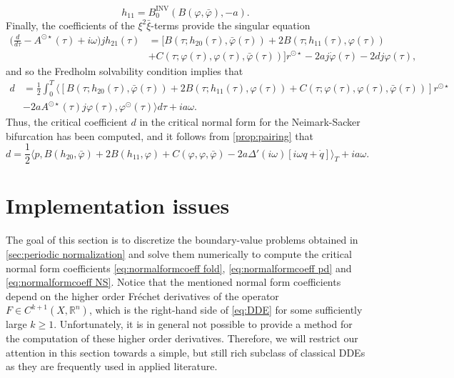 \documentclass[english]{myarticle}
\DeclareMathOperator{\inv}{INV}
\begin{document}
\begin{sloppypar}
\begin{equation*}
    h_{11} = B_{0}^{\inv}(B(\varphi,\bar{\varphi}), -a).
\end{equation*}
Finally, the coefficients of the $\xi^2 \bar{\xi}$-terms provide the singular equation
\begin{align*}
    \bigg(\frac{d}{d \tau} - A^{\odot \star}(\tau) + {i \omega} \bigg)j h_{21}(\tau)  &= [B(\tau;h_{20}(\tau),\bar{\varphi}(\tau)) + 2B(\tau;h_{11}(\tau),\varphi(\tau)) \\
    & + C(\tau;\varphi(\tau),\varphi(\tau),\bar{\varphi}(\tau))]r^{\odot \star} - 2 a j\dot{\varphi}(\tau) -2d j\varphi(\tau),
\end{align*}
and so the Fredholm solvability condition implies that
\begin{align*} 
    d &= \frac{1}{2}\int_0^T \langle [B(\tau;h_{20}(\tau),\bar{\varphi}(\tau)) + 2B(\tau;h_{11}(\tau),\varphi(\tau))  + C(\tau;\varphi(\tau),\varphi(\tau),\bar{\varphi}(\tau))]r^{\odot \star} \nonumber\\ 
    & - 2aA^{\odot \star}(\tau)j\varphi(\tau),  \varphi^\odot(\tau) \rangle  d\tau + i a \omega.
\end{align*}
Thus, the critical coefficient $d$ in the critical normal form for the Neimark-Sacker bifurcation has been computed, and it follows from \cref{prop:pairing} that
\begin{equation} \label{eq:normalformcoeff NS}
    d = \frac{1}{2} \langle p, B(h_{20},\bar{\varphi}) + 2B(h_{11},\varphi)  + C(\varphi,\varphi,\bar{\varphi}) -2a\Delta'(i \omega)[i\omega q + \dot{q}]  \rangle_T + ia\omega.
\end{equation}

\section{Implementation issues} \label{sec:implementation}
The goal of this section is to discretize the boundary-value problems obtained in \cref{sec:periodic normalization} and solve them numerically to compute the critical normal form coefficients \eqref{eq:normalformcoeff fold}, \eqref{eq:normalformcoeff pd} and \eqref{eq:normalformcoeff NS}. Notice that the mentioned normal form coefficients depend on the higher order Fr\'echet derivatives of the operator $F \in C^{k+1}(X,\mathbb{R}^n)$, which is the right-hand side of \eqref{eq:DDE} for some sufficiently large $k \geq 1$. Unfortunately, it is in general not possible to provide a method for the computation of these higher order derivatives. Therefore, we will restrict our attention in this section towards a simple, but still rich subclass of classical DDEs as they are frequently used in applied literature. 

\end{sloppypar}
\end{document}
